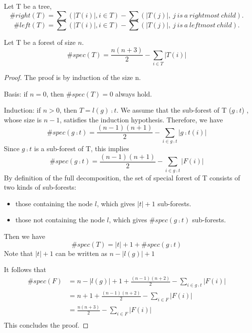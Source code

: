 \begin{remark}
Let T be a tree,
\begin{equation*}
\#right(T) = \sum(\left\vert T(i) \right\vert, i \in T) - \sum(\left\vert T(j) \right\vert,\ j\ is\ a\ rightmost\ child).
\end{equation*}
\begin{equation*}
\#left(T) = \sum(\left\vert T(i) \right\vert, i \in T) - \sum(\left\vert T(j) \right\vert,\ j\ is\ a\ leftmost\ child).
\end{equation*}
\end{remark}

\begin{lemma}
Let T be a forest of size $n$.
\begin{equation*}
\#spec(T) = \frac{n(n+3)}{2} - \sum_{i \in T}\left\vert T(i) \right\vert
\end{equation*}
\end{lemma}
\begin{proof}
The proof is by induction of the size n.

Basis: if $n=0$, then $\#spec(T) = 0$ always hold.

Induction: if $n > 0$, then $T = l(g) \comp t$. We assume that the sub-forest of T ($g \comp t$) , whose size is $n - 1$, satisfies the induction hypothesis. Therefore, we have
\begin{equation*}
\#spec(g \comp t) = \frac{(n-1)(n+1)}{2} - \sum_{i \in g \comp t}\left\vert g \comp t(i) \right\vert
\end{equation*}
Since $g \comp t$ is a sub-forest of T, this implies
\begin{equation*}
\#spec(g \comp t) = \frac{(n-1)(n+1)}{2} - \sum_{i \in g \comp t}\left\vert F(i) \right\vert
\end{equation*}
By definition of the full decomposition, the set of special forest of T consists of two kinds of sub-forests:
\begin{itemize}
\item those containing the node $l$, which gives $\left\vert t \right\vert + 1$ sub-forests.
\item those not containing the node $l$, which gives $\#spec(g \comp t)$ sub-forests.
\end{itemize}
Then we have
\begin{equation*}
\#spec(T) = \left\vert t \right\vert + 1 + \#spec(g \comp t)
\end{equation*}
Note that $\left\vert t \right\vert + 1$ can be written as $n - \left\vert l(g) \right\vert + 1$
 
It follows that 
\begin{align*}
\#spec(F) &= n - \left\vert l(g) \right\vert + 1 + \frac{(n - 1)(n + 2)}{2} - \sum_{i \in g \comp t}\left\vert F(i) \right\vert \\
&= n + 1 + \frac{(n - 1)(n + 2)}{2} - \sum_{i \in F}\left\vert F(i) \right\vert \\
&= \frac{n(n+3)}{2} - \sum_{i \in F}\left\vert F(i) \right\vert\\
\end{align*}
This concludes the proof.
\end{proof}
